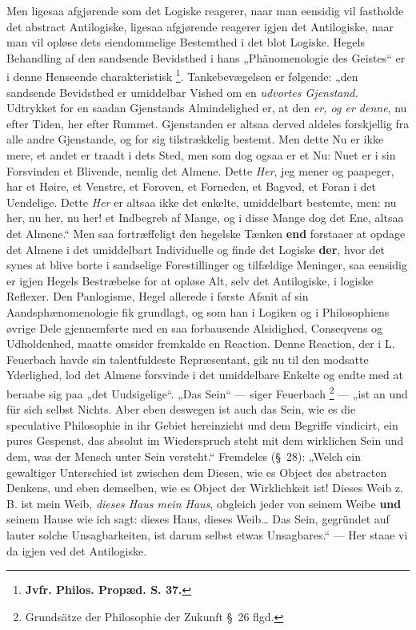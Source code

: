 \documentclass[11pt]{book}
\newcommand{\opage}[1]{\marginnote{\footnotesize\textit{[#1]}}}
\begin{document}
Men ligesaa afgjørende som det Logiske reagerer, naar man eensidig
vil fastholde det abstract Antilogiske, ligesaa afgjørende reagerer
igjen det Antilogiske, naar man vil opløse dets eiendommelige
Bestemthed i det blot Logiske. Hegels Behandling af den sandsende
Bevidsthed i hans „Phänomenologie des Geistes“ er i denne Henseende
charakteristisk%
\footnote{%
\textbf{Jvfr. Philos. Propæd. S. 37.}}. Tankebevægelsen er følgende:
„den sandsende Bevidsthed er umiddelbar Vished om en \emph{udvortes
Gjenstand.} Udtrykket for en saadan Gjenstands Almindelighed er, at
den \emph{er, og er denne}, nu efter Tiden, her efter Rummet.
Gjenstanden er altsaa derved aldeles forskjellig fra alle andre
\opage{159} \setcounter{footnote}{0}%
Gjenstande, og for sig tilstrækkelig bestemt. Men dette Nu er ikke
mere, et andet er traadt i dets Sted, men som dog ogsaa er et Nu: Nuet
er i sin Forsvinden et Blivende, nemlig det Almene. Dette
\emph{Her}, jeg mener og paapeger, har et Høire, et Venstre, et
Foroven, et Forneden, et Bagved, et Foran i det Uendelige. Dette
\emph{Her} er altsaa ikke det enkelte, umiddelbart bestemte, men: nu
her, nu her, nu her! et Indbegreb af Mange, og i disse Mange dog det
Ene, altsaa det Almene.“ Men saa fortræffeligt den hegelske Tænken
\textbf{end} forstaaer at opdage det Almene i det umiddelbart
Individuelle og finde det Logiske \textbf{der}, hvor det synes at
blive borte i sandselige Forestillinger og tilfældige Meninger, saa
eensidig er igjen Hegels Bestræbelse for at opløse Alt, selv det
Antilogiske, i logiske Reflexer. Den Panlogisme, Hegel allerede i
første Afsnit af sin Aandsphænomenologie fik grundlagt, og som han i
Logiken og i Philosophiens øvrige Dele gjennemførte med en saa
forbausende Alsidighed, Conseqvens og Udholdenhed, maatte omsider
fremkalde en Reaction. Denne Reaction, der i L. Feuerbach havde sin
talentfuldeste Repræsentant, gik nu til den modsatte Yderlighed, lod
det Almene forsvinde i det umiddelbare Enkelte og endte med at beraabe
sig paa „det Uudsigelige“. „Das Sein“ --- siger Feuerbach%
\footnote{%
Grundsätze der Philosophie der Zukunft \S~26 flgd.} --- „ist an und
für sich selbst Nichts. Aber eben deswegen ist auch das Sein, wie es
die speculative Philosophie in ihr Gebiet hereinzieht und dem Begriffe
vindicirt, ein pures Gespenst, das absolut im Wiederspruch steht mit
dem wirklichen Sein und dem, was der Mensch unter Sein versteht.“
Fremdeles (\S~28): „Welch ein gewaltiger Unterschied ist zwischen dem
Diesen, wie es Object des abstracten Denkens, und eben demselben, wie
es Object der Wirklichkeit ist! Dieses Weib z. B. ist mein Weib,
\emph{dieses Haus mein Haus}, obgleich jeder von seinem Weibe
\textbf{und} seinem Hause wie ich sagt: dieses Haus,
\opage{160} \setcounter{footnote}{0}%
dieses Weib\dots{} Das Sein, gegründet auf lauter solche
Unsagbarkeiten, ist darum selbst etwas Unsagbares.“ --- Her staae vi
da igjen ved det Antilogiske.
\end{document}
